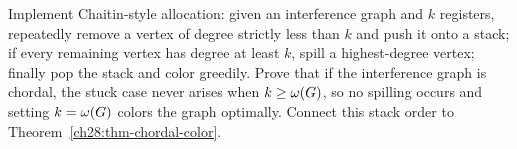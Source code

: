\begin{exercise}
\label{ch28:ex-regalloc}
Implement Chaitin-style allocation: given an interference graph and $k$ registers,
repeatedly remove a vertex of degree strictly less than $k$ and push it onto a stack; if every remaining vertex has degree at least $k$, spill a
highest-degree vertex; finally pop the stack and color greedily. Prove that if the interference graph
is chordal, the stuck case never arises when $k\ge\omega(G)$, so no spilling occurs
and setting $k=\omega(G)$ colors the graph optimally. Connect this stack order to Theorem~\ref{ch28:thm-chordal-color}.
\end{exercise}
